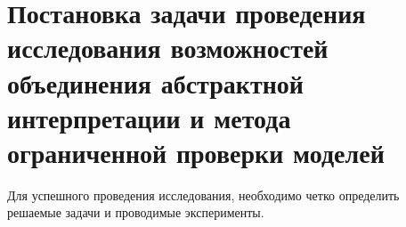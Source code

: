 \chapter{Постановка задачи проведения исследования возможностей объединения
абстрактной интерпретации и метода ограниченной проверки моделей}

Для успешного проведения исследования, необходимо четко определить решаемые 
задачи и проводимые эксперименты.